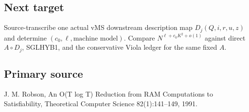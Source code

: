 \documentclass[11pt]{article}
\begin{document}
\subsection*{Next target}
Source-transcribe one actual vMS downstream description map $D_j(Q,i,r,u,z)$ and determine $(c_0,\ell,\text{machine model})$. Compare $N^{\ell+c_0K^2+o(1)}$ against direct $A\circ D_j$, SGLHYB1, and the conservative Viola ledger for the same fixed $A$.

\subsection*{Primary source}
J. M. Robson, An O(T log T) Reduction from RAM Computations to Satisfiability, Theoretical Computer Science 82(1):141--149, 1991.
\end{document}
